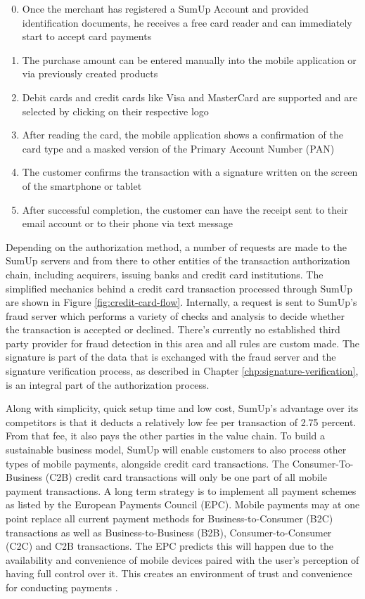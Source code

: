 \documentclass[a4paper, oneside]{csthesis}
\begin{document}
\begin{enumerate}
\setcounter{enumi}{-1}
    \item Once the merchant has registered a SumUp Account and provided identification documents, he receives a free card reader and can immediately start to accept card payments
    \item The purchase amount can be entered manually into the mobile application or via previously created products
    \item Debit cards and credit cards like Visa and MasterCard are supported and are selected by clicking on their respective logo
    \item After reading the card, the mobile application shows a confirmation of the card type and a masked version of the Primary Account Number (PAN)
    \item The customer confirms the transaction with a signature written on the screen of the smartphone or tablet
    \item After successful completion, the customer can have the receipt sent to their email account or to their phone via text message
\end{enumerate}


Depending on the authorization method, a number of requests are made to the SumUp servers and from there to other entities of the transaction authorization chain, including acquirers, issuing banks and credit card institutions. The simplified mechanics behind a credit card transaction processed through SumUp are shown in Figure \ref{fig:credit-card-flow}.  Internally, a request is sent to SumUp's fraud server which performs a variety of checks and analysis to decide whether the transaction is accepted or declined. There's currently no established third party provider for fraud detection in this area and all rules are custom made. The signature is part of the data that is exchanged with the fraud server and the signature verification process, as described in Chapter \ref{chp:signature-verification}, is an integral part of the  authorization process.


Along with simplicity, quick setup time and low cost, SumUp's advantage over its competitors is that it deducts a relatively low fee per transaction of 2.75 percent. From that fee, it also pays the other parties in the value chain. To build a sustainable business model, SumUp will enable customers to also process other types of mobile payments, alongside credit card transactions. The Consumer-To-Business (C2B) credit card transactions will only be one part of all mobile payment transactions. A long term strategy is to implement all payment schemes as listed by the European Payments Council (EPC). Mobile payments may at one point replace all current payment methods for Business-to-Consumer (B2C) transactions as well as Business-to-Business (B2B), Consumer-to-Consumer (C2C) and C2B transactions. The EPC predicts this will happen due to the availability and convenience of mobile devices paired with the user's perception of having full control over it. This creates an environment of trust and convenience for conducting payments \cite{mpwhitepaper}.
\end{document}
